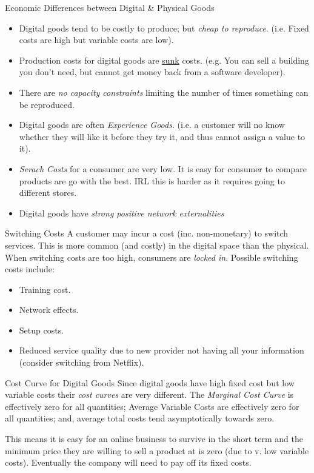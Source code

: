 \documentclass[11pt,a4paper]{article}
\begin{document}
\begin{proposition}{Economic Differences between Digital \& Physical Goods}
  \begin{itemize}
    \item Digital goods tend to be costly to produce; but \textit{cheap to reproduce}. (i.e. Fixed costs are high but variable costs are low).
    \item Production costs for digital goods are \underline{sunk} costs. (e.g. You can sell a building you don't need, but cannot get money back from a software developer).
    \item There are \textit{no capacity constraints} limiting the number of times something can be reproduced.
    \item Digital goods are often \textit{Experience Goods}. (i.e. a customer will no know whether they will like it before they try it, and thus cannot assign a value to it).
    \item \textit{Serach Costs} for a consumer are very low. It is easy for consumer to compare products are go with the best. IRL this is harder as it requires going to different stores.
    \item Digital goods have \textit{strong positive network externalities}
  \end{itemize}
\end{proposition}

\begin{remark}{Switching Costs}
  A customer may incur a cost (inc. non-monetary) to switch services. This is more common (and costly) in the digital space than the physical. When switching costs are too high, consumers are \textit{locked in}. Possible switching costs include:
  \begin{itemize}
    \item Training cost.
    \item Network effects.
    \item Setup costs.
    \item Reduced service quality due to new provider not having all your information (consider switching from Netflix).
  \end{itemize}
\end{remark}

\begin{proposition}{Cost Curve for Digital Goods}
  Since digital goods have high fixed cost but low variable costs their \textit{cost curves} are very different. The \textit{Marginal Cost Curve} is effectively zero for all quantities; Average Variable Costs are effectively zero for all quantities; and, average total costs tend asymptotically towards zero.
  \par This means it is easy for an online business to survive in the short term and the minimum price they are willing to sell a product at is zero (due to v. low variable costs). Eventually the company will need to pay off its fixed costs.
\end{proposition}
\end{document}
